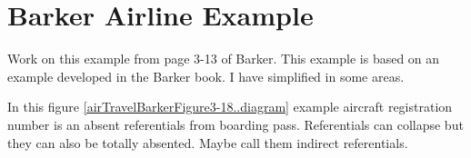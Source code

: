 \section{Barker Airline Example}
\label{BarkerAirlineExample}

\mynote Work on this example from page 3-13 of Barker.
{This example is based on an example developed in the Barker book. I have simplified in some areas.}


\begin{noteforfuture}
In this figure \ref{airTravelBarkerFigure3-18..diagram} example aircraft registration number is an absent referentials from
boarding pass. Referentials can collapse but they can also be totally absented. Maybe call them indirect referentials. 
\end{noteforfuture}


